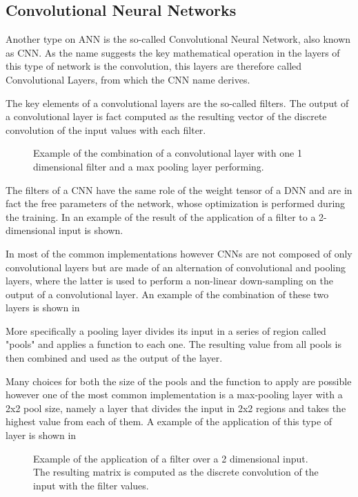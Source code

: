 \subsection{Convolutional Neural Networks}\label{cnn}

Another type on ANN is the so-called Convolutional Neural Network, also known as CNN. As the name suggests the key mathematical operation in the layers of this type of network is the convolution, this layers are therefore called Convolutional Layers, from which the CNN name derives.

The key elements of a convolutional layers are the so-called filters. The output of a convolutional layer is fact computed as the resulting vector of the discrete convolution of the input values with each filter. 

\begin{figure}
    \centering
  
    \caption{Example of the combination of a convolutional layer with one 1 dimensional filter and a max pooling layer performing.  }
    \label{fig:cnn_tot}
\end{figure}
The filters of a CNN have the same role of the weight tensor of a DNN and are in fact the free parameters of the network, whose optimization is performed during the training. In  an example of the result of the application of a filter to a 2-dimensional input is shown.

In most of the common implementations however CNNs are not composed of only convolutional layers but are made of an alternation of convolutional and pooling layers, where the latter is used to  perform a non-linear down-sampling on the output of a convolutional layer. An example of the combination of these two layers is shown in 


More specifically a pooling layer divides its input in a series of region called "pools" and applies a function to each one.
The resulting value from all pools is then combined and used as the output of the layer.

Many choices for both the size of the pools and the function to apply are possible however one of the most common implementation is a max-pooling layer with a 2x2 pool size, namely a layer that divides the input in 2x2 regions and takes the highest value from each of them. A example of the application of this type of layer is shown in  

\begin{figure}[h]
    \centering
      
    \caption{Example of the application of a filter over a 2 dimensional input. The resulting matrix is computed as the discrete convolution of the input with the filter values.}
    \label{fig:cnn_filter}
\end{figure}


